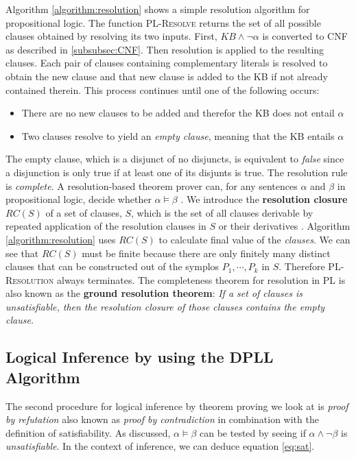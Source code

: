 Algorithm \ref{algorithm:resolution} shows a simple resolution algorithm for propositional logic. The function \textsc{PL-Resolve} returns the set of all possible clauses obtained by resolving its two inputs. First, $KB\wedge\neg\alpha$ is converted to CNF as described in \ref{subsubsec:CNF}. Then resolution is applied to the resulting clauses. Each pair of clauses containing complementary literals is resolved to obtain the new clause and that new clause is added to the KB if not already contained therein. This process continues until one of the following occurs:
\begin{itemize}
	\item There are no new clauses to be added and therefor the KB does not entail $\alpha$
	\item Two clauses resolve to yield an \textit{empty clause}, meaning that the KB entails $\alpha$
\end{itemize}

The empty clause, which is a disjunct of no disjuncts, is equivalent to \textit{false} since a disjunction is only true if at least one of its disjunts is true. 
The resolution rule is \textit{complete}. A resolution-based theorem prover can, for any sentences
$\alpha$ and $\beta$ in propositional logic, decide whether $\alpha \models \beta$ \citep{russell2016artificial}. We introduce the \textbf{resolution closure} $RC(S)$ of a set of clauses, $S$, which is the set of all clauses derivable by repeated application of the resolution clauses in $S$ or their derivatives \citep{russell2016artificial}. Algorithm \ref{algorithm:resolution} uses  $RC(S)$ to calculate final value of the \textit{clauses}. We can see that $RC(S)$ must be finite because there are only finitely many distinct clauses that can be constructed out of the symplos $P_1, \cdots, P_k$ in $S$. Therefore \textsc{PL-Resolution} always terminates. The completeness theorem for resolution in PL is also known as the \textbf{ground resolution theorem}: \textit{If a set of clauses is unsatisfiable, then the resolution closure of those clauses
contains the empty clause.}



\subsection{Logical Inference by using the DPLL Algorithm}
\label{subsec:Inference_DPLL}

The second procedure for logical inference by theorem proving we look at is \textit{proof by refutation} also known as \textit{proof by contradiction} in combination with the definition of satisfiability. As discussed, $\alpha \models \beta$ can be tested by seeing if $\alpha \wedge \neg \beta$ is \textit{unsatisfiable}. In the context of inference, we can deduce equation \ref{eq:sat}.


